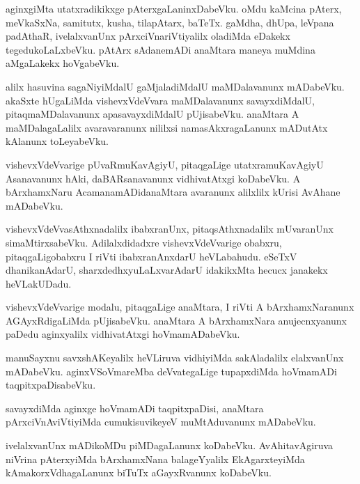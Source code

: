 \documentclass{article}
\begin{document}
\begin{mn}%
aginxgiMta utatxradikikxge pAterxgaLaninxDabeVku. oMdu kaMcina pAterx,
meVkaSxNa, samitutx, kusha, tilapAtarx, baTeTx. gaMdha, dhUpa, leVpana
padAthaR, ivelalxvanUnx pArxciVnariVtiyalilx oladiMda eDakekx
tegedukoLaLxbeVku. pAtArx sAdanemADi anaMtara maneya muMdina
aMgaLakekx hoVgabeVku.
\end{mn}

\begin{mn}%
alilx hasuvina sagaNiyiMdalU gaMjaladiMdalU maMDalavanunx
mADabeVku. akaSxte hUgaLiMda vishevxVdeVvara maMDalavanunx
savayxdiMdalU, pitaqmaMDalavanunx apasavayxdiMdalU
pUjisabeVku. anaMtara A maMDalagaLalilx avaravaranunx nililxsi
namasAkxragaLanunx mADutAtx kAlanunx toLeyabeVku.
\end{mn}

\begin{mn}
vishevxVdeVvarige pUvaRmuKavAgiyU, pitaqgaLige utatxramuKavAgiyU
Asanavanunx hAki, daBARsanavanunx vidhivatAtxgi koDabeVku. A
bArxhamxNaru AcamanamADidanaMtara avaranunx alilxlilx kUrisi AvAhane mADabeVku.
\end{mn}

\begin{mn}
vishevxVdeVvasAthxnadalilx ibabxranUnx, pitaqsAthxnadalilx mUvaranUnx
simaMtirxsabeVku. Adilalxdidadxre vishevxVdeVvarige obabxru,
pitaqgaLigobabxru I riVti ibabxranAnxdarU heVLabahudu. eSeTxV
dhanikanAdarU, sharxdedhxyuLaLxvarAdarU idakikxMta hecucx janakekx heVLakUDadu.
\end{mn}

\begin{mn}%
vishevxVdeVvarige modalu, pitaqgaLige anaMtara, I riVti A
bArxhamxNaranunx AGAyxRdigaLiMda pUjisabeVku. anaMtara A bArxhamxNara
anujecnxyanunx paDedu aginxyalilx vidhivatAtxgi hoVmamADabeVku.
\end{mn}

\begin{mn}%
manuSayxnu savxshAKeyalilx heVLiruva vidhiyiMda sakAladalilx
elalxvanUnx mADabeVku. aginxVSoVmareMba deVvategaLige tupapxdiMda
hoVmamADi taqpitxpaDisabeVku.
\end{mn}

\begin{mn}
savayxdiMda aginxge hoVmamADi taqpitxpaDisi, anaMtara
pArxciVnAviVtiyiMda cumukisuvikeyeV muMtAduvanunx mADabeVku.
\end{mn}

\begin{mn}%
ivelalxvanUnx mADikoMDu piMDagaLanunx koDabeVku. AvAhitavAgiruva
niVrina pAterxyiMda bArxhamxNana balageYyalilx EkAgarxteyiMda
kAmakorxVdhagaLanunx biTuTx aGayxRvanunx koDabeVku.
\end{mn}
\end{document}
